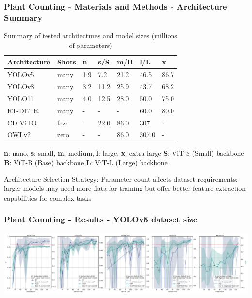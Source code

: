 \documentclass[aspectratio=43]{beamer}
\begin{document}
\begin{frame}
    \frametitle{Plant Counting - Materials and Methods - Architecture Summary}
    
    \begin{table}[H]
        \scriptsize
        \caption{Summary of tested architectures and model sizes (millions of parameters)}
        \begin{tabularx}{\textwidth}{lXXXXXX}
        \toprule
        \textbf{Architecture} &\textbf{Shots} & \textbf{n} & \textbf{s/S} & \textbf{m/B} & \textbf{l/L} & \textbf{x} \\
        \midrule
        YOLOv5 & many & 1.9 & 7.2 & 21.2 & 46.5 & 86.7 \\
        YOLOv8 & many & 3.2 & 11.2 & 25.9 & 43.7 & 68.2 \\
        YOLO11 & many & 4.0 & 12.5 & 28.0 & 50.0 & 75.0 \\
        RT-DETR & many & - & - & - & 60.0 & 80.0 \\
        CD-ViTO & few & - & 22.0 & 86.0 & 307. & - \\
        OWLv2 & zero & - & - & 86.0 & 307.0 & - \\
        \bottomrule
        \end{tabularx}
    \end{table}
    
        \scriptsize
        \textbf{n}: nano, \textbf{s}: small, \textbf{m}: medium, \textbf{l}: large, \textbf{x}: extra-large
        \textbf{S}: ViT-S (Small) backbone
        \textbf{B}: ViT-B (Base) backbone
        \textbf{L}: ViT-L (Large) backbone

    
    \begin{alertblock}{Architecture Selection Strategy:}
        \small
        Parameter count affects dataset requirements: larger models may need more data for training but offer better feature extraction capabilities for complex tasks
    \end{alertblock}
\end{frame}

\begin{frame}
    \frametitle{Plant Counting - Results - YOLOv5 dataset size}
    \begin{center}
        \includegraphics[width=1\textwidth]{Imgs/r2_ap_vs_dataset_size_yolov5.pdf}
    \end{center}
\end{frame}
\end{document}
